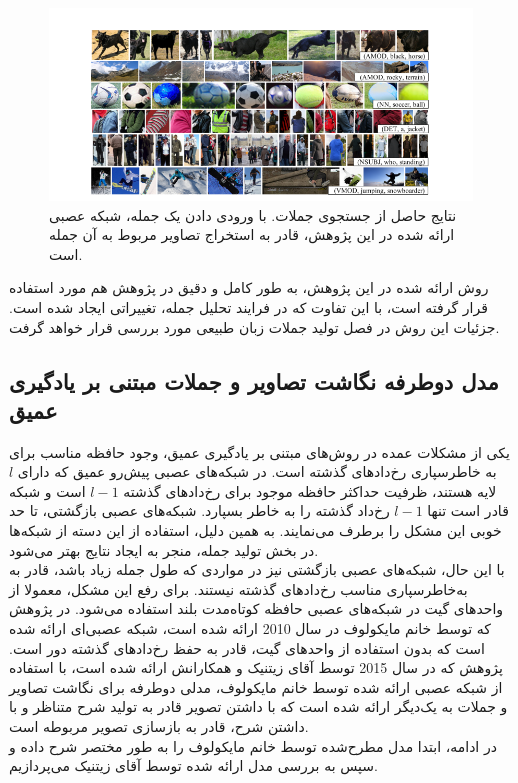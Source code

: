 \begin{figure}[h]
	\center
	\includegraphics[scale=0.5]{./Imgs/karpathy2014deep_res2.png}
	\caption[نتایج حاصل از جستجوی جملات در روش ]{نتایج حاصل از جستجوی جملات. با ورودی دادن یک جمله، شبکه عصبی ارائه شده در این پژوهش، قادر به استخراج تصاویر مربوط به آن جمله است.\cite{karpathy2014deep}}
	\label{fig:k2014res2}
\end{figure}

روش ارائه شده در این پژوهش، به طور کامل و دقیق در پژوهش \cite{Karpathy_2015_CVPR} هم مورد استفاده قرار گرفته است، با این تفاوت که در فرایند تحلیل جمله، تغییراتی ایجاد شده است. جزئیات این روش در فصل تولید جملات زبان طبیعی مورد بررسی قرار خواهد گرفت.

\subsection{مدل دوطرفه نگاشت تصاویر و جملات مبتنی بر یادگیری عمیق}
یکی از مشکلات عمده در روش‌های مبتنی بر یادگیری عمیق، وجود حافظه مناسب برای به‌‌ خاطرسپاری رخ‌دادهای گذشته است. در شبکه‌های عصبی پیش‌رو عمیق که دارای $l$ لایه هستند، ظرفیت حداکثر حافظه موجود برای رخ‌دادهای گذشته $l-1$ است و شبکه قادر است تنها $l-1$ رخ‌داد گذشته را به‌ خاطر بسپارد. شبکه‌های عصبی بازگشتی، تا حد خوبی این مشکل را برطرف می‌نمایند. به همین دلیل، استفاده از این دسته از شبکه‌ها در بخش تولید جمله، منجر به ایجاد نتایج بهتر می‌شود. 
\\
با این حال، شبکه‌های عصبی بازگشتی نیز در مواردی که طول جمله زیاد باشد، قادر به به‌خاطرسپاری مناسب رخ‌دادهای گذشته نیستند. برای رفع این مشکل، معمولا از واحد‌های گیت در شبکه‌های عصبی حافظه کوتاه‌مدت بلند استفاده می‌شود. در پژوهش \cite{mikolov2010recurrent} که توسط خانم مایکولوف
در سال 2010 ارائه شده است، شبکه عصبی‌ای ارائه شده است که بدون استفاده از واحدهای گیت، قادر به حفظ رخ‌دادهای گذشته دور است. پژوهش \cite{chen2015mind} که در سال 2015 توسط آقای زیتنیک و همکارانش ارائه شده است، با استفاده از شبکه عصبی ارائه شده توسط خانم مایکولوف، مدلی دوطرفه برای نگاشت تصاویر و جملات به یک‌دیگر ارائه شده است که با داشتن تصویر قادر به تولید شرح متناظر و با داشتن شرح، قادر به بازسازی تصویر مربوطه است.
\\
در ادامه، ابتدا مدل مطرح‌شده توسط خانم مایکولوف را به طور مختصر شرح داده و سپس به بررسی مدل ارائه شده توسط آقای زیتنیک می‌پردازیم.

